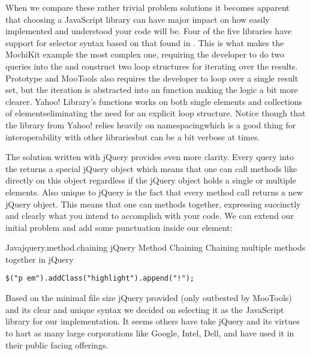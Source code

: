 When we compare these rather trivial problem solutions it becomes apparent
that choosing a JavaScript library can have major impact on how easily
implemented and understood your code will be. Four of the five libraries
have support for selector syntax based on
that found in %
.
This is what makes the MochiKit example the most complex one, requiring the
developer to do two queries into the  and construct two
loop structures for iterating over the results.
Prototype and MooTools also requires the developer to loop over a single
result set, but the iteration is abstracted into an  function
making the logic a bit more clearer. Yahoo!  Library's 
functions works on both single elements and collections of
elements\dash{}eliminating the need for an explicit loop structure.
Notice though that the library from
Yahoo! relies heavily on namespacing\dash{}which is a good thing for
interoperability with other libraries\dash{}but can be a bit verbose at times.

The solution written with jQuery provides even more clarity.
Every query into the  returns a special jQuery object which means
that one can call methods like  directly on this object
regardless if the jQuery object holds a single or multiple elements.
Also unique to jQuery is the fact that every method call returns a new jQuery
object. This means that one can  methods together, expressing
succinctly and clearly what you intend to accomplish with your code. We can
extend our initial problem and add some punctuation inside our 
element:

\begin{scode}{Java}{jquery.method.chaining}{%
  jQuery Method Chaining}{%
  Chaining multiple methods together in jQuery}
\begin{lstlisting}
$("p em").addClass("highlight").append("!");
\end{lstlisting}
\end{scode}

Based on the minimal file size jQuery provided (only outbested by MooTools)
and its clear and unique syntax we decided on selecting it as the JavaScript
library for our implementation. It seems others have take jQuery and its
virtues to hart as many large corporations like Google, Intel, Dell, and
 have used it in their public facing offerings.%

